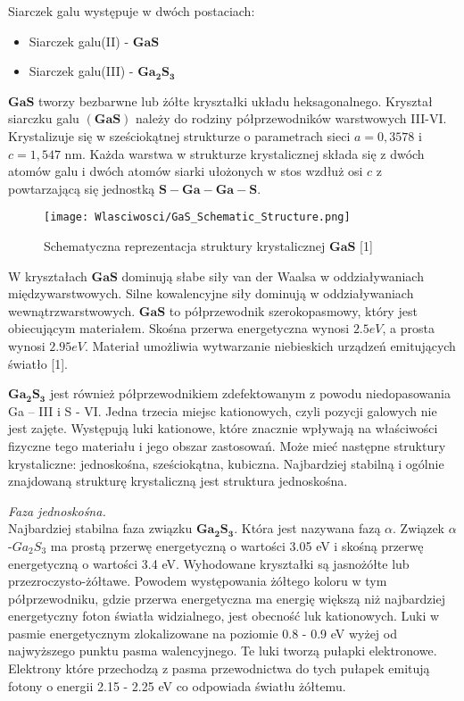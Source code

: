 Siarczek galu występuje w dwóch postaciach:
\begin{itemize}
	\item Siarczek galu(II) - $\mathbf{GaS}$
	\item Siarczek galu(III) - $\mathbf{Ga_{2}S_{3}}$
\end{itemize}
$\mathbf{GaS}$ tworzy bezbarwne lub żółte kryształki układu heksagonalnego. Kryształ siarczku galu $\mathbf{(GaS)}$ należy do rodziny półprzewodników warstwowych III-VI. Krystalizuje się w sześciokątnej strukturze o parametrach sieci $a = 0,3578$ i $c = 1,547$ nm. Każda warstwa w strukturze krystalicznej składa się z dwóch atomów galu i dwóch atomów siarki ułożonych w stos wzdłuż osi $c$ z powtarzającą się jednostką $\mathbf{S-Ga-Ga-S}$.
\begin{figure}[H]
	\begin{center}
		\texttt{[image: Wlasciwosci/GaS\_Schematic\_Structure.png]}
		\caption{Schematyczna reprezentacja struktury krystalicznej $\mathbf{GaS}$ [1]}
	\end{center}
\end{figure}

W kryształach $\mathbf{GaS}$ dominują słabe siły van der Waalsa w oddziaływaniach międzywarstwowych. Silne kowalencyjne siły dominują w oddziaływaniach wewnątrzwarstwowych.
$\mathbf{GaS}$ to półprzewodnik szerokopasmowy, który jest obiecującym materiałem. Skośna przerwa energetyczna wynosi $2.5eV$, a prosta wynosi $2.95eV$. Materiał umożliwia
wytwarzanie niebieskich urządzeń emitujących światło [1].

$\mathbf{Ga_{2}S_{3}}$ jest również półprzewodnikiem zdefektowanym z powodu niedopasowania Ga – III i S - VI. Jedna trzecia miejsc kationowych, czyli pozycji galowych nie jest zajęte. Występują luki kationowe, które znacznie wpływają na właściwości fizyczne tego materiału i jego obszar zastosowań. Może mieć następne struktury krystaliczne: jednoskośna, sześciokątna, kubiczna. Najbardziej stabilną i ogólnie znajdowaną strukturę krystaliczną jest struktura jednoskośna.

\textit{Faza jednoskośna.} \\
Najbardziej stabilna faza związku $\mathbf{Ga_{2}S_{3}}$. Która jest nazywana fazą $\alpha$. Związek $\alpha$-$Ga_{2}S_{3}$ ma prostą przerwę energetyczną o wartości 3.05 eV i skośną przerwę energetyczną o wartości 3.4 eV. Wyhodowane kryształki są jasnożółte lub przezroczysto-żółtawe. Powodem występowania żółtego koloru w tym półprzewodniku, gdzie przerwa energetyczna ma energię większą niż najbardziej energetyczny foton światła widzialnego, jest obecność luk kationowych. Luki w pasmie energetycznym zlokalizowane na poziomie 0.8 - 0.9 eV wyżej od najwyższego punktu pasma walencyjnego. Te luki tworzą pułapki elektronowe. Elektrony które przechodzą z pasma przewodnictwa do tych pułapek emitują fotony o energii 2.15 - 2.25 eV co odpowiada światłu żółtemu.

